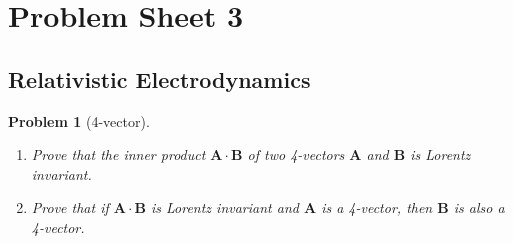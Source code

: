 \documentclass[a4paper]{article}
\theoremstyle{new}
\newtheorem{qns}{Problem}
\begin{document}
\section{Problem Sheet 3}
\subsection*{Relativistic Electrodynamics}
\begin{qns}[4-vector]\leavevmode
\begin{enumerate}[label=(\roman*)]
\item Prove that the inner product $\mathbf{A}\cdot\mathbf{B}$ of two 4-vectors $\mathbf{A}$ and $\mathbf{B}$ is Lorentz invariant.
\item Prove that if $\mathbf{A}\cdot\mathbf{B}$ is Lorentz invariant and $\mathbf{A}$ is a 4-vector, then $\mathbf{B}$ is also a 4-vector.
\end{enumerate}
\end{qns}
\end{document}
